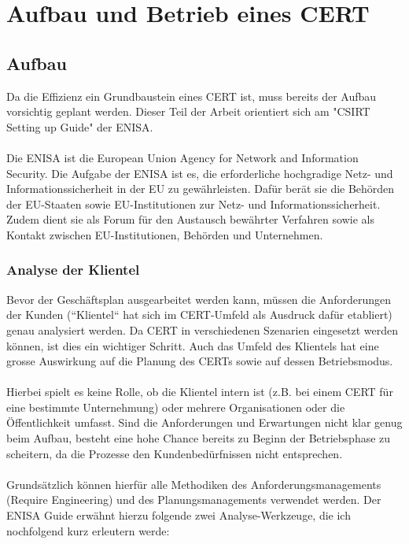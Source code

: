 
\chapter{Aufbau und Betrieb eines CERT}

\ifpdf
    \graphicspath{{Figs/Raster/}{Figs/PDF/}{Figs/}}
\else
    \graphicspath{{Figs/Vector/}{Figs/}}
\fi

\section{Aufbau}
Da die Effizienz ein Grundbaustein eines CERT ist, muss bereits der Aufbau vorsichtig geplant werden. Dieser Teil der Arbeit orientiert sich am "CSIRT Setting up Guide" der ENISA.~\citep{enisaguide} \\
\\
Die ENISA ist die European Union Agency for Network and Information Security. Die Aufgabe der ENISA ist es, die erforderliche hochgradige Netz- und Informationssicherheit in der EU zu gewährleisten. Dafür berät sie die Behörden der EU-Staaten sowie EU-Institutionen zur Netz- und Informationssicherheit. Zudem dient sie als Forum für den Austausch bewährter Verfahren sowie als Kontakt zwischen EU-Institutionen, Behörden und Unternehmen.

\subsection{Analyse der Klientel}
Bevor der Geschäftsplan ausgearbeitet werden kann, müssen die Anforderungen der Kunden (``Klientel`` hat sich im CERT-Umfeld als Ausdruck dafür etabliert) genau analysiert werden. Da CERT in verschiedenen Szenarien eingesetzt werden können, ist dies ein wichtiger Schritt. Auch das Umfeld des Klientels hat eine grosse Auswirkung auf die Planung des CERTs sowie auf dessen Betriebsmodus. \\
\\
Hierbei spielt es keine Rolle, ob die Klientel intern ist (z.B. bei einem CERT für eine bestimmte Unternehmung) oder mehrere Organisationen oder die Öffentlichkeit umfasst. Sind die Anforderungen und Erwartungen nicht klar genug beim Aufbau, besteht eine hohe Chance bereits zu Beginn der Betriebsphase zu scheitern, da die Prozesse den Kundenbedürfnissen nicht entsprechen. \\
\\
Grundsätzlich können hierfür alle Methodiken des Anforderungsmanagements (Require Engineering) und des Planungsmanagements verwendet werden. Der ENISA Guide erwähnt hierzu folgende zwei Analyse-Werkzeuge, die ich nochfolgend kurz erleutern werde:

